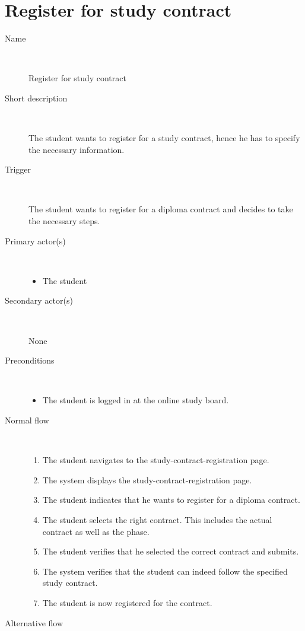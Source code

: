 \section{Register for study contract}

\begin{description}
	\item[Name] \
		\par Register for study contract
	\item[Short description] \ 
			\par The student wants to register for a study contract, hence he has to
			specify the necessary information.
	\item[Trigger] \ 
			\par The student wants to register for a diploma contract and decides to take
			the necessary steps.
	\item[Primary actor(s)] \ 
		\begin{itemize}
		  \item The student
		\end{itemize}
	\item[Secondary actor(s)] \ 
		\par None
	\item[Preconditions] \ 
	\begin{itemize}
		\item The student is logged in at the online study board.
	\end{itemize}
	\item[Normal flow] \ 
	\begin{enumerate}
	  	\item The student navigates to the study-contract-registration page.
	  	\item The system displays the study-contract-registration page.
	  	\item The student indicates that he wants to register for a diploma
	  	contract.
	  	\item The student selects the right contract. This includes the actual
	  	contract as well as the phase.
	  	\item The student verifies that he selected the correct contract and submits.
	  	\item The system verifies that the student can indeed follow the specified
	  	study contract.
	  	\item The student is now registered for the contract.
	\end{enumerate}
	\item[Alternative flow] \

\end{description}
